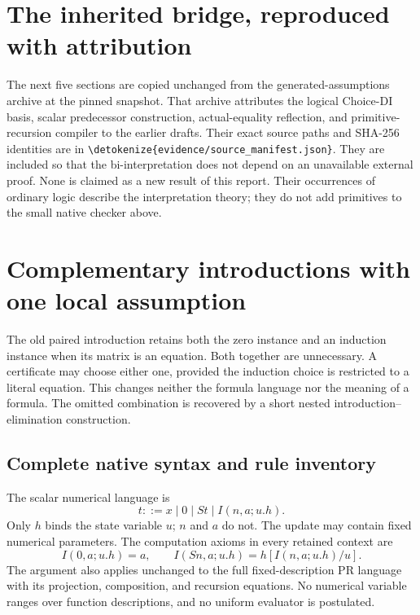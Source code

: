 \documentclass[11pt,letterpaper]{article}
\theoremstyle{definition}\newtheorem{definition}[theorem]{Definition}
\theoremstyle{remark}\newtheorem{remark}[theorem]{Remark}
\newcommand{\file}[1]{\expandafter\nolinkurl\expandafter{\detokenize{#1}}}
\begin{document}

\clearpage
\section*{The inherited bridge, reproduced with attribution}
The next five sections are copied unchanged from the generated-assumptions
archive at the pinned snapshot. That archive attributes the logical
Choice-DI basis, scalar predecessor construction, actual-equality
reflection, and primitive-recursion compiler to the earlier drafts.
Their exact source paths and SHA-256 identities are in
\file{evidence/source_manifest.json}. They are included so that the
bi-interpretation does not depend on an unavailable external proof.
None is claimed as a new result of this report. Their occurrences of
ordinary logic describe the interpretation theory; they do not add
primitives to the small native checker above.

\section{Complementary introductions with one local assumption}
\label{sec:choice-introduction}

The old paired introduction retains both the zero instance and an
induction instance when its matrix is an equation. Both together are
unnecessary. A certificate may choose either one, provided the induction
choice is restricted to a literal equation. This changes neither the
formula language nor the meaning of a formula. The omitted combination
is recovered by a short nested introduction--elimination construction.

\subsection{Complete native syntax and rule inventory}

The scalar numerical language is
\[
 t::=x\mid0\mid St\mid I(n,a;u.h).
\]
Only $h$ binds the state variable $u$; $n$ and $a$ do not.
The update may contain fixed numerical parameters. The computation
axioms in every retained context are
\[
 I(0,a;u.h)=a,\qquad
 I(Sn,a;u.h)=h[I(n,a;u.h)/u].
 \tag{I0, IS}\label{eq:choice-computations}
\]
The argument also applies unchanged to the full fixed-description PR
language with its projection, composition, and recursion equations.
No numerical variable ranges over function descriptions, and no uniform
evaluator is postulated.
\end{document}
